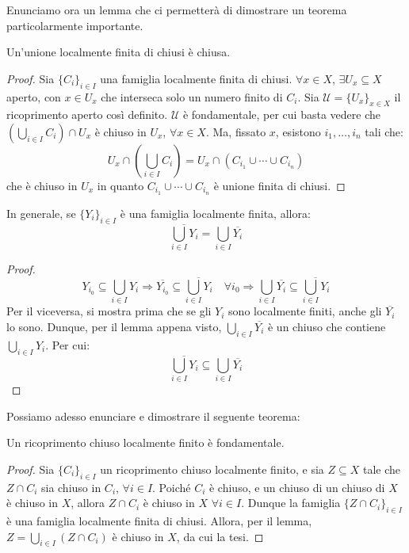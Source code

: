 Enunciamo ora un lemma che ci permetterà di dimostrare un teorema particolarmente importante.

\begin{lm}
Un'unione localmente finita di chiusi è chiusa.
\end{lm}
\begin{proof}
Sia $\{C_i\}_{i \in I}$ una famiglia localmente finita di chiusi. $\forall x \in X$, $\exists U_x \subseteq X$ aperto, con $x \in U_x$ che interseca solo un numero finito di $C_i$. Sia $\mathcal{U}=\{U_x\}_{x \in X}$ il ricoprimento aperto così definito. $\mathcal{U}$ è fondamentale, per cui basta vedere che $\left(\bigcup _{i \in I} C_i\right) \cap U_x$ è chiuso in $U_x$, $\forall x \in X$. Ma, fissato $x$, esistono $i_1, \dots ,i_n$ tali che:
$$U_x \cap \left(\bigcup _{i \in I} C_i\right) = U_x \cap (C_{i_1} \cup \cdots \cup C_{i_n})$$
che è chiuso in $U_x$ in quanto $C_{i_1} \cup \cdots \cup C_{i_n}$ è unione finita di chiusi.
\end{proof}

\begin{cor}
In generale, se $\{Y_i\}_{i \in I}$ è una famiglia localmente finita, allora:
$$\overline{\bigcup _{i \in I} Y_i}=\bigcup _{i \in I} \overline{Y_i}$$
\end{cor}
\begin{proof}
$$Y_{i_0} \subseteq \bigcup _{i \in I} Y_i \Longrightarrow \overline{Y_{i_0}} \subseteq \overline{\bigcup _{i \in I} Y_i} \quad \forall i_0 \Longrightarrow \bigcup _{i \in I} \overline{Y_i} \subseteq \overline{\bigcup _{i \in I} Y_i}$$
Per il viceversa, si mostra prima che se gli $Y_i$ sono localmente finiti, anche gli $\overline{Y_i}$ lo sono. Dunque, per il lemma appena visto, $\bigcup _{i \in I} \overline{Y_i}$ è un chiuso che contiene $\bigcup _{i \in I} Y_i$. Per cui:
$$\overline{\bigcup _{i \in I} Y_i} \subseteq \bigcup _{i \in I} \overline{Y_i}$$
\end{proof}

Possiamo adesso enunciare e dimostrare il seguente teorema:
\begin{thm}
Un ricoprimento chiuso localmente finito è fondamentale.
\end{thm}
\begin{proof}
Sia $\{C_i\} _{i \in I}$ un ricoprimento chiuso localmente finito, e sia $Z \subseteq X$ tale che $Z \cap C_i$ sia chiuso in $C_i$, $\forall i \in I$. Poiché $C_i$ è chiuso, e un chiuso di un chiuso di $X$ è chiuso in $X$, allora $Z \cap C_i$ è chiuso in $X$ $\forall i \in I$. Dunque la famiglia $\{Z \cap C_i \} _{i \in I}$ è una famiglia localmente finita di chiusi. Allora, per il lemma, $Z=\bigcup _{i \in I} (Z \cap C_i)$ è chiuso in $X$, da cui la tesi.
\end{proof}
